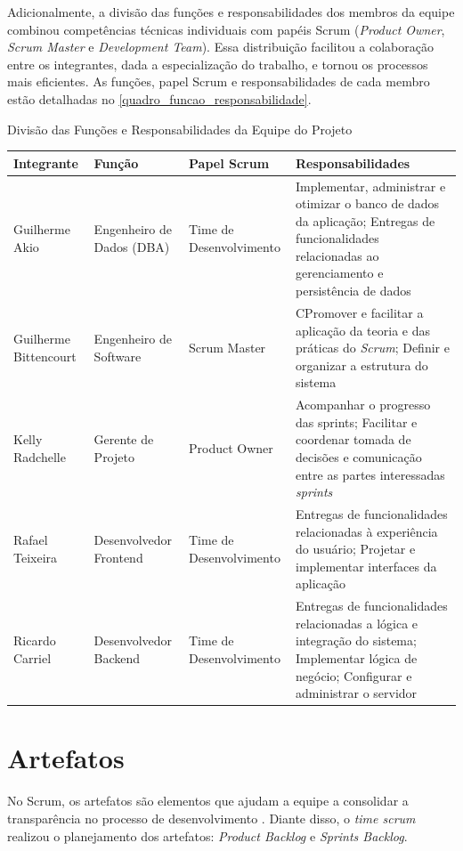 \documentclass[
	12pt,				%
	openany,			%
	oneside,			%
	a4paper,			%
	english,			%
	french,				%
	spanish,			%
	brazil				%
	]{abntex2}
\renewcommand{\arraystretch}{1.4}
\begin{document}
Adicionalmente, a divisão das funções e responsabilidades dos membros da equipe combinou competências técnicas individuais com papéis Scrum (\textit{Product Owner}, \textit{Scrum Master} e \textit{Development Team}). Essa distribuição facilitou a colaboração entre os integrantes, dada a especialização do trabalho, e tornou os processos mais eficientes. As funções, papel Scrum e responsabilidades de cada membro estão detalhadas no \autoref{quadro_funcao_responsabilidade}.
%	
\begin{quadro}[H]
	\caption{Divisão das Funções e Responsabilidades da Equipe do Projeto}
	\label{quadro_funcao_responsabilidade}
	\renewcommand{\arraystretch}{1.3} %
	\begin{tabular}{|>{\raggedright\arraybackslash}m{3cm} 
			|>{\raggedright\arraybackslash}m{2.6cm} |>{\raggedright\arraybackslash}m{2.6cm} 
			|>{\raggedright\arraybackslash}m{6cm}|}
		\hline
		\textbf{Integrante} & \textbf{Função} &  \textbf{Papel Scrum}& \textbf{Responsabilidades} \\ \hline
		Guilherme Akio & Engenheiro de Dados (DBA) & Time de Desenvolvimento & Implementar, administrar e otimizar o banco de dados da aplicação; Entregas de funcionalidades relacionadas ao gerenciamento e persistência de dados 
		\\ \hline
		Guilherme Bittencourt & Engenheiro de Software & Scrum Master & CPromover e facilitar a aplicação da teoria e das práticas do \textit{Scrum}; Definir e organizar a estrutura do sistema
		\\ \hline
		Kelly Radchelle & Gerente de Projeto & Product Owner & Acompanhar o progresso das sprints; Facilitar e coordenar tomada de decisões e comunicação entre as partes interessadas \textit{sprints} 
		 \\ \hline
		Rafael Teixeira & Desenvolvedor Frontend &  Time de Desenvolvimento & Entregas de funcionalidades relacionadas à experiência do usuário; Projetar e implementar interfaces da aplicação
		\\ \hline
		Ricardo Carriel & Desenvolvedor Backend &  Time de Desenvolvimento & Entregas de funcionalidades relacionadas a lógica e integração do sistema;  Implementar lógica de negócio; Configurar e administrar o servidor
		\\ \hline
	\end{tabular}
\end{quadro}
\section{Artefatos}
No Scrum,  os artefatos são elementos que ajudam a equipe a consolidar a transparência no processo de desenvolvimento  \cite{scrumguide}. Diante disso, o \textit {time scrum} realizou o planejamento dos artefatos:  \textit {Product Backlog} e \textit {Sprints Backlog}.
%
\end{document}
